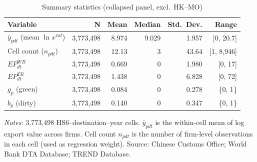 \documentclass[12pt]{article}
\begin{document}
\begin{table}[htbp]
\centering
\caption{Summary statistics (collapsed panel, excl.\ HK--MO)}
\label{tab:sumstats_collapsed}
\small
\begin{threeparttable}
\begin{tabular}{lrrrrr}
\toprule
Variable & N & Mean & Median & Std.\ Dev. & Range \\
\midrule
$\bar{y}_{pdt}$ (mean $\ln x^{val}$) & 3{,}773{,}498 & 8.974 & 9.029 & 1.957 & [0, 20.7] \\
Cell count ($n_{pdt}$) & 3{,}773{,}498 & 12.13 & 3 & 43.64 & [1, 8{,}946] \\
$EP^{WB}_{dt}$ & 3{,}773{,}498 & 0.669 & 0 & 1.980 & [0, 17] \\
$EP^{TR}_{dt}$ & 3{,}773{,}498 & 1.438 & 0 & 6.828 & [0, 72] \\
$g_p$ (green) & 3{,}773{,}498 & 0.084 & 0 & 0.278 & \{0, 1\} \\
$b_p$ (dirty) & 3{,}773{,}498 & 0.140 & 0 & 0.347 & \{0, 1\} \\
\bottomrule
\end{tabular}
\begin{tablenotes}\footnotesize
\item \emph{Notes:} 3{,}773{,}498 HS6--destination--year cells. $\bar{y}_{pdt}$ is the within-cell
mean of log export value across firms. Cell count $n_{pdt}$ is the number of firm-level
observations in each cell (used as regression weight). Source: Chinese Customs Office; World Bank DTA Database; TREND Database.
\end{tablenotes}
\end{threeparttable}
\end{table}
\end{document}
